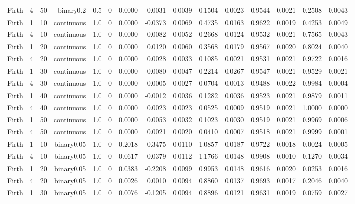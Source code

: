 \begin{longtable}{rrrrrrrrrrrrrrr}
  Firth & 4 & 50 & binary0.2 & 0.5 & 0 & 0.0000 & 0.0031 & 0.0039 & 0.1504 & 0.0023 & 0.9544 & 0.0021 & 0.2508 & 0.0043 \\ 
  Firth & 1 & 10 & continuous & 1.0 & 0 & 0.0000 & -0.0373 & 0.0069 & 0.4735 & 0.0163 & 0.9622 & 0.0019 & 0.4253 & 0.0049 \\ 
  Firth & 4 & 10 & continuous & 1.0 & 0 & 0.0000 & 0.0082 & 0.0052 & 0.2668 & 0.0124 & 0.9532 & 0.0021 & 0.7565 & 0.0043 \\ 
  Firth & 1 & 20 & continuous & 1.0 & 0 & 0.0000 & 0.0120 & 0.0060 & 0.3568 & 0.0179 & 0.9567 & 0.0020 & 0.8024 & 0.0040 \\ 
  Firth & 4 & 20 & continuous & 1.0 & 0 & 0.0000 & 0.0028 & 0.0033 & 0.1085 & 0.0021 & 0.9531 & 0.0021 & 0.9722 & 0.0016 \\ 
  Firth & 1 & 30 & continuous & 1.0 & 0 & 0.0000 & 0.0080 & 0.0047 & 0.2214 & 0.0267 & 0.9547 & 0.0021 & 0.9529 & 0.0021 \\ 
  Firth & 4 & 30 & continuous & 1.0 & 0 & 0.0000 & 0.0005 & 0.0027 & 0.0704 & 0.0013 & 0.9488 & 0.0022 & 0.9984 & 0.0004 \\ 
  Firth & 1 & 40 & continuous & 1.0 & 0 & 0.0000 & -0.0012 & 0.0036 & 0.1282 & 0.0036 & 0.9523 & 0.0021 & 0.9879 & 0.0011 \\ 
  Firth & 4 & 40 & continuous & 1.0 & 0 & 0.0000 & 0.0023 & 0.0023 & 0.0525 & 0.0009 & 0.9519 & 0.0021 & 1.0000 & 0.0000 \\ 
  Firth & 1 & 50 & continuous & 1.0 & 0 & 0.0000 & 0.0053 & 0.0032 & 0.1023 & 0.0030 & 0.9519 & 0.0021 & 0.9969 & 0.0006 \\ 
  Firth & 4 & 50 & continuous & 1.0 & 0 & 0.0000 & 0.0021 & 0.0020 & 0.0410 & 0.0007 & 0.9518 & 0.0021 & 0.9999 & 0.0001 \\ 
  Firth & 1 & 10 & binary0.05 & 1.0 & 0 & 0.2018 & -0.3475 & 0.0110 & 1.0857 & 0.0187 & 0.9722 & 0.0018 & 0.0024 & 0.0005 \\ 
  Firth & 4 & 10 & binary0.05 & 1.0 & 0 & 0.0617 & 0.0379 & 0.0112 & 1.1766 & 0.0148 & 0.9908 & 0.0010 & 0.1270 & 0.0034 \\ 
  Firth & 1 & 20 & binary0.05 & 1.0 & 0 & 0.0383 & -0.2208 & 0.0099 & 0.9953 & 0.0148 & 0.9616 & 0.0020 & 0.0253 & 0.0016 \\ 
  Firth & 4 & 20 & binary0.05 & 1.0 & 0 & 0.0026 & 0.0010 & 0.0094 & 0.8860 & 0.0137 & 0.9693 & 0.0017 & 0.2046 & 0.0040 \\ 
  Firth & 1 & 30 & binary0.05 & 1.0 & 0 & 0.0076 & -0.1205 & 0.0094 & 0.8896 & 0.0121 & 0.9631 & 0.0019 & 0.0759 & 0.0027 \\ 

\end{longtable}
